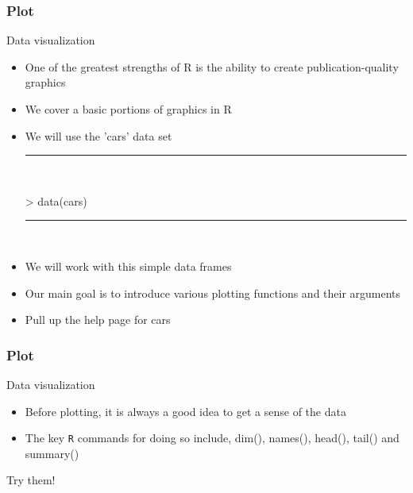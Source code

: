\documentclass{beamer}
\begin{document}
\begin{frame}[fragile]
	\frametitle{Plot}
	\centering \Large Data visualization
	\begin{itemize}
		\small
		\item One of the greatest strengths of R is the ability to create publication-quality graphics
		\item We cover a basic portions of graphics in R
		\item We will use the 'cars' data set
\rule{\textwidth}{0.4pt}\\
\tiny
\setlength{\fancyvrbtopsep}{-1pt}
\setlength{\fancyvrbpartopsep}{-1pt}
\begin{Schunk}
\begin{Sinput}
> data(cars)
\end{Sinput}
\end{Schunk}
\rule{\textwidth}{0.4pt}\\
\small
		\item We will work with this simple data frames
		\item Our main goal is to introduce various plotting functions and their arguments
		\item Pull up the help page for cars
	\end{itemize}
\end{frame}

\begin{frame}[fragile]
	\frametitle{Plot}
	\centering \Large Data visualization
	\begin{itemize}
		\small
		\item Before plotting, it is always a good idea to get a sense of the data 
		\item The key \texttt{R} commands for doing so include, dim(), names(), head(), tail() and summary()
	\end{itemize}

	\begin{center} \normalsize Try them! \end{center}
\end{frame}
\end{document}
